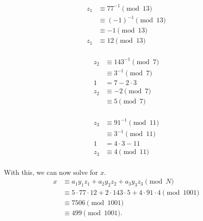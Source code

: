 \documentclass[11pt]{article}
\begin{document}
\begin{enumerate}
\begin{enumerate}
          \begin{minipage}{0.28\textwidth}
            \begin{align*}
              z_1      &\equiv 77^{-1} \pmod{13} \\
                       &\equiv (-1)^{-1} \pmod{13} \\
                       &\equiv -1 \pmod{13} \\
              z_1      &\equiv 12 \pmod{13} \\
            \end{align*}
          \end{minipage}
          \begin{minipage}{0.28\textwidth}
            \begin{align*}
              z_2      &\equiv 143^{-1} \pmod{7} \\
                       &\equiv 3^{-1} \pmod{7} \\
              1        &= 7 - 2 \cdot 3 \\
              z_2      &\equiv -2 \pmod{7} \\
                       &\equiv 5 \pmod{7} \\
            \end{align*}
          \end{minipage}
          \begin{minipage}{0.28\textwidth}
            \begin{align*}
              z_3      &\equiv 91^{-1} \pmod{11} \\
                       &\equiv 3^{-1} \pmod{11} \\
              1        &= 4 \cdot 3 - 11 \\
              z_3      &\equiv 4 \pmod{11} \\
            \end{align*}
          \end{minipage}

          With this, we can now solve for \(x\).
          \begin{align*}
            x &\equiv a_1y_1z_1 + a_2y_2z_2 + a_3y_3z_3 \pmod{N} \\ 
              &\equiv 5 \cdot 77 \cdot 12 + 2 \cdot 143 \cdot 5 + 4 \cdot 91 \cdot 4 \pmod{1001} \\
              &\equiv 7506 \pmod{1001} \\
              &\equiv 499 \pmod{1001}. \\
          \end{align*}


\end{enumerate}
\end{enumerate}
\end{document}
